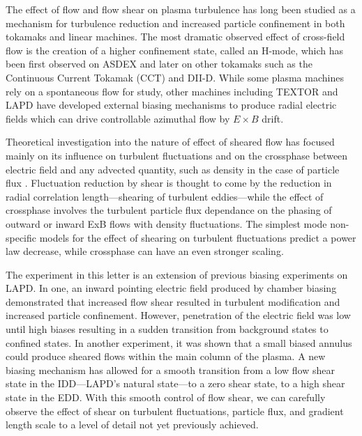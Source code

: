 \documentclass[%
 aps,
 prl,
 amsmath,amssymb,
 reprint,%
]{revtex4-1}
\begin{document}
	The effect of flow and flow shear on plasma turbulence has long been studied as a mechanism for turbulence reduction and increased particle confinement in both tokamaks and linear machines.  The most dramatic observed effect of cross-field flow is the creation of a higher confinement state, called an H-mode, which has been first observed on ASDEX\cite{wagner82} and later on other tokamaks such as the Continuous Current Tokamak (CCT)\cite{taylor89,tynan92} and DII-D\cite{groebner90,moyer95}. While some plasma machines rely on a spontaneous flow for study\cite{tynan06}, other machines including TEXTOR\cite{boedo00} and LAPD\cite{maggs07,carter09} have developed external biasing mechanisms to produce radial electric fields which can drive controllable azimuthal flow by $E \times B$ drift\cite{weynants93}.

Theoretical investigation into the nature of effect of sheared flow has focused mainly on its influence on turbulent fluctuations \cite{biglari90} and on the crossphase between electric field and any advected quantity, such as density in the case of particle flux \cite{ware96,terry01}. Fluctuation reduction by shear is thought to come by the reduction in radial correlation length---shearing of turbulent eddies---while the effect of crossphase involves the turbulent particle flux dependance on the phasing of outward or inward ExB flows with density fluctuations. The simplest mode non-specific models for the effect of shearing on turbulent fluctuations predict a power law decrease\cite{biglari90}, while crossphase can have an even stronger scaling\cite{terry01}.

The experiment in this letter is an extension of previous biasing experiments on LAPD. In one, an inward pointing electric field produced by chamber biasing demonstrated that increased flow shear resulted in turbulent modification and increased particle confinement\cite{carter09}. However, penetration of the electric field was low until high biases resulting in a sudden transition from background states to confined states. In another experiment, it was shown that a small biased annulus could produce sheared flows within the main column of the plasma\cite{zhou12}. A new biasing mechanism has allowed for a smooth transition from a low flow shear state in the IDD---LAPD's natural state---to a zero shear state, to a high shear state in the EDD. With this smooth control of flow shear, we can carefully observe the effect of shear on turbulent fluctuations, particle flux, and gradient length scale to a level of detail not yet previously achieved.
\end{document}
